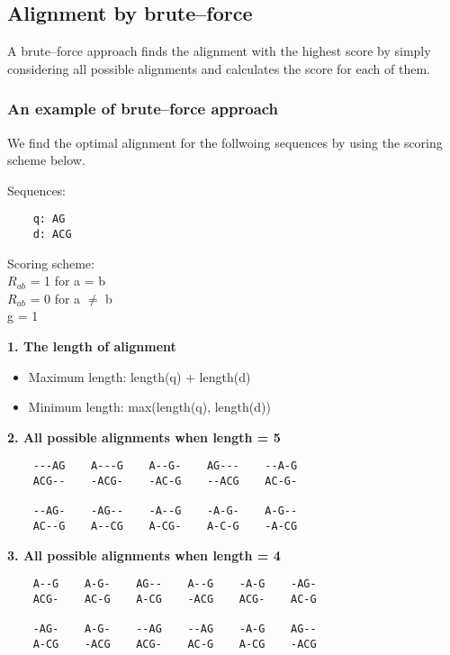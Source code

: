 %
%

%
%
\subsection{Alignment by brute--force}
A brute--force approach finds the alignment with the highest score by simply considering all possible alignments and calculates the score for each of them.

%
%
\subsubsection*{An example of brute--force approach}
We find the optimal alignment for the follwoing sequences by using the scoring scheme below.

\begin{multicols}{2}
Sequences:
\begin{verbatim}
    q: AG
    d: ACG
\end{verbatim}
\vfill\null
\columnbreak

\noindent Scoring scheme: \\ 
$R_{ab}$ = 1 for a = b \\ 
$R_{ab}$ = 0 for a $\neq$ b \\ 
g = 1

\end{multicols} 

\noindent \textbf{1. The length of alignment}
\begin{itemize}
\item Maximum length: length(q) + length(d)
\item Minimum length: max(length(q), length(d))
\end{itemize}
\medskip 

\noindent \textbf{2. All possible alignments when length = 5}
\begin{verbatim}
    ---AG    A---G    A--G-    AG---    --A-G
    ACG--    -ACG-    -AC-G    --ACG    AC-G-

    --AG-    -AG--    -A--G    -A-G-    A-G--
    AC--G    A--CG    A-CG-    A-C-G    -A-CG
\end{verbatim}
\medskip

\noindent \textbf{3. All possible alignments when length = 4}
\begin{verbatim}
    A--G    A-G-    AG--    A--G    -A-G    -AG-
    ACG-    AC-G    A-CG    -ACG    ACG-    AC-G

    -AG-    A-G-    --AG    --AG    -A-G    AG--
    A-CG    -ACG    ACG-    AC-G    A-CG    -ACG
\end{verbatim}
\medskip

